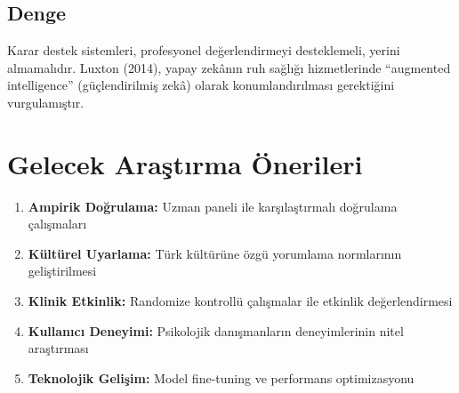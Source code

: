 \subsection{Denge}

Karar destek sistemleri, profesyonel değerlendirmeyi desteklemeli, yerini almamalıdır. Luxton (2014), yapay zekânın ruh sağlığı hizmetlerinde ``augmented intelligence'' (güçlendirilmiş zekâ) olarak konumlandırılması gerektiğini vurgulamıştır.

\section{Gelecek Araştırma Önerileri}

\begin{enumerate}
  \item \textbf{Ampirik Doğrulama:} Uzman paneli ile karşılaştırmalı doğrulama çalışmaları
  \item \textbf{Kültürel Uyarlama:} Türk kültürüne özgü yorumlama normlarının geliştirilmesi
  \item \textbf{Klinik Etkinlik:} Randomize kontrollü çalışmalar ile etkinlik değerlendirmesi
  \item \textbf{Kullanıcı Deneyimi:} Psikolojik danışmanların deneyimlerinin nitel araştırması
  \item \textbf{Teknolojik Gelişim:} Model fine-tuning ve performans optimizasyonu
\end{enumerate}

\newpage
